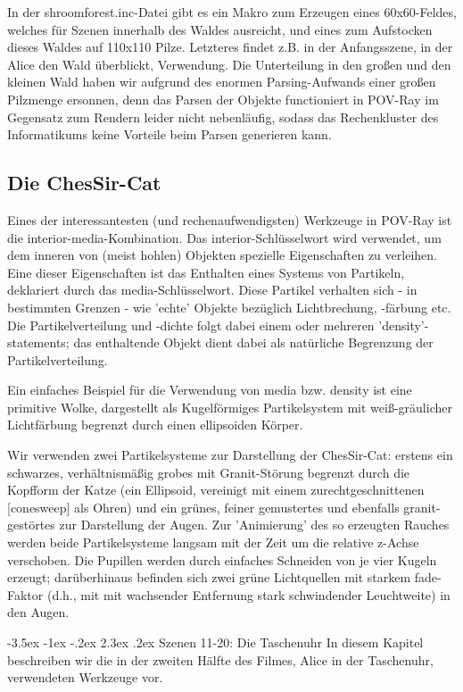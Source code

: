 \documentclass[twocolumn]{article}
\makeatletter
\renewcommand\section{\@startsection{section}{1}{\z@}%
                                      {-3.5ex \@plus -1ex \@minus -.2ex}%
                                      {2.3ex \@plus.2ex}%
                                      {\normalfont\large\bfseries}}
\makeatother
\begin{document}
In der shroomforest.inc-Datei gibt es ein Makro zum Erzeugen eines 60x60-Feldes, welches für Szenen innerhalb des Waldes ausreicht, und eines zum Aufstocken dieses Waldes auf 110x110 Pilze. Letzteres findet z.B. in der Anfangsszene, in der Alice den Wald überblickt, Verwendung.
Die Unterteilung in den großen und den kleinen Wald haben wir aufgrund des enormen Parsing-Aufwands einer großen Pilzmenge ersonnen, denn das Parsen der Objekte functioniert in POV-Ray im Gegensatz zum Rendern leider nicht nebenläufig, sodass das Rechenkluster des Informatikums keine Vorteile beim Parsen generieren kann.

\subsection{Die ChesSir-Cat}

Eines der interessantesten (und rechenaufwendigsten) Werkzeuge in POV-Ray ist die interior-media-Kombination. Das interior-Schlüsselwort wird verwendet, um dem inneren von (meist hohlen) Objekten spezielle Eigenschaften zu verleihen. Eine dieser Eigenschaften ist das Enthalten eines Systems von Partikeln, deklariert durch das media-Schlüsselwort. Diese Partikel verhalten sich - in bestimmten Grenzen - wie 'echte' Objekte bezüglich Lichtbrechung, -färbung etc. Die Partikelverteilung und -dichte folgt dabei einem oder mehreren 'density'-statements; das enthaltende Objekt dient dabei als natürliche Begrenzung der Partikelverteilung.

Ein einfaches Beispiel für die Verwendung von media bzw. density ist eine primitive Wolke, dargestellt als Kugelförmiges Partikelsystem mit weiß-gräulicher Lichtfärbung begrenzt durch einen ellipsoiden Körper.

Wir verwenden zwei Partikelsysteme zur Darstellung der ChesSir-Cat: erstens ein schwarzes, verhältnismäßig grobes mit Granit-Störung begrenzt durch die Kopfform der Katze (ein Ellipsoid, vereinigt mit einem zurechtgeschnittenen [conesweep] als Ohren) und ein grünes, feiner gemustertes und ebenfalls granit-gestörtes zur Darstellung der Augen. Zur 'Animierung' des so erzeugten Rauches werden beide Partikelsysteme langsam mit der Zeit um die relative z-Achse verschoben. Die Pupillen werden durch einfaches Schneiden von je vier Kugeln erzeugt; darüberhinaus befinden sich zwei grüne Lichtquellen mit starkem fade-Faktor (d.h., mit mit wachsender Entfernung stark schwindender Leuchtweite) in den Augen.

\section{Szenen 11-20: Die Taschenuhr}
In diesem Kapitel beschreiben wir die in der zweiten Hälfte des Filmes, Alice in der Taschenuhr, verwendeten Werkzeuge vor.
\end{document}
